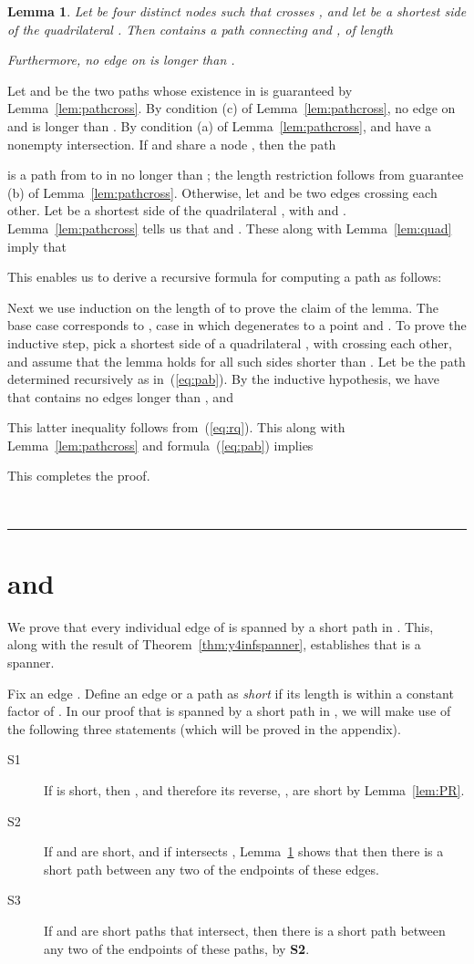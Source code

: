 \pdfoutput=1  \documentclass[11pt]{article}
\newtheorem{lemma}{Lemma}
\newcommand{\qed}{\rule{0.5em}{1.5ex}}
\newcommand{\fqed}{{\hfill~\qed}}
\newenvironment{proof}{{\noindent \bf Proof.}}
                      {{\hfill \fqed} \vspace{1em}}
\begin{document}
\begin{lemma}
Let  be four distinct nodes such that
 crosses
, and let
 be a shortest side of the quadrilateral .
Then  contains a path  connecting  and , of length

Furthermore, no edge on  is longer than .
\label{lem:recross}
\end{lemma}
\begin{proof}
Let  and  be the two paths whose existence in  is
guaranteed by Lemma~\ref{lem:pathcross}. By condition (c) of
Lemma~\ref{lem:pathcross}, no edge on  and  is longer
than . By condition (a) of Lemma~\ref{lem:pathcross},  and
 have a nonempty intersection. If  and 
share a node , then the path

is a path from  to  in  no longer than ;
the length restriction follows from guarantee (b) of Lemma~\ref{lem:pathcross}.
Otherwise, let  and
 be two edges crossing
each other. Let  be a shortest side of the quadrilateral
, with  and .
Lemma~\ref{lem:pathcross} tells us that  and .
These along with Lemma~\ref{lem:quad} imply that

This enables us to derive a recursive formula for computing a path
 as follows:

Next we use induction on the length of  to prove the claim of the lemma.
The base case corresponds to , case in which  degenerates to a point
and .
To prove the inductive step, pick a shortest side  of a quadrilateral , with
 crossing each other, and assume that
the lemma holds for all such sides shorter than .
Let  be the path determined recursively as in~(\ref{eq:pab}).
By the inductive hypothesis, we have that  contains no edges longer
than , and

This latter inequality follows from~(\ref{eq:rq}). This along with Lemma~\ref{lem:pathcross}
and formula~(\ref{eq:pab}) implies

This completes the proof.
\end{proof}

\section{ and }
\label{sec:Yinf+Y4}
We prove that every individual edge of  is spanned by a
short path in . This, along with the result of
Theorem~\ref{thm:y4infspanner}, establishes that  is a spanner.

Fix an edge . Define an edge or
a path as \emph{short} if its length is within a constant factor
of . In our proof that  is spanned by a short path in
, we will make use of the following three statements
(which will be proved in the appendix).
\begin{description}
\item[S1]
If  is short, then ,
and therefore its reverse, ,
are short by Lemma~\ref{lem:PR}.
\item[S2]
If  and  are short, and if
 intersects , Lemma~\ref{lem:recross} shows that
then there is a short path between any two of the endpoints
of these edges.
\item[S3]
If  and  are short paths that intersect,
then there is a short path  between any two of the endpoints
of these paths, by {\bf S2}.
\end{description}
\end{document}
